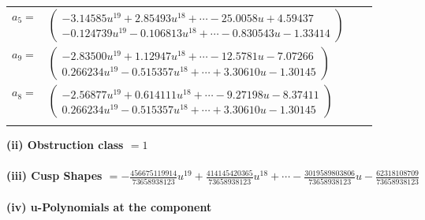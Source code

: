 \documentclass[1p]{elsarticle_modified}
\theoremstyle{definition}
\begin{document}
\begin{tabular}{m{7pt} m{180pt} m{7pt} m{180pt} }
\flushright $a_{5}=$&$\begin{pmatrix}-3.14585 u^{19}+2.85493 u^{18}+\cdots-25.0058 u+4.59437\\-0.124739 u^{19}-0.106813 u^{18}+\cdots-0.830543 u-1.33414\end{pmatrix}$ \\
\flushright $a_{9}=$&$\begin{pmatrix}-2.83500 u^{19}+1.12947 u^{18}+\cdots-12.5781 u-7.07266\\0.266234 u^{19}-0.515357 u^{18}+\cdots+3.30610 u-1.30145\end{pmatrix}$ \\
\flushright $a_{8}=$&$\begin{pmatrix}-2.56877 u^{19}+0.614111 u^{18}+\cdots-9.27198 u-8.37411\\0.266234 u^{19}-0.515357 u^{18}+\cdots+3.30610 u-1.30145\end{pmatrix}$\\&\end{tabular}
\flushleft \textbf{(ii) Obstruction class $= 1$}\\~\\
\flushleft \textbf{(iii) Cusp Shapes $= -\frac{456675119914}{73658938123} u^{19}+\frac{414145420365}{73658938123} u^{18}+\cdots-\frac{3019589803806}{73658938123} u-\frac{62318108709}{73658938123}$}\\~\\
\newpage\renewcommand{\arraystretch}{1}
\flushleft \textbf{(iv) u-Polynomials at the component}\newline \\
\end{document}

